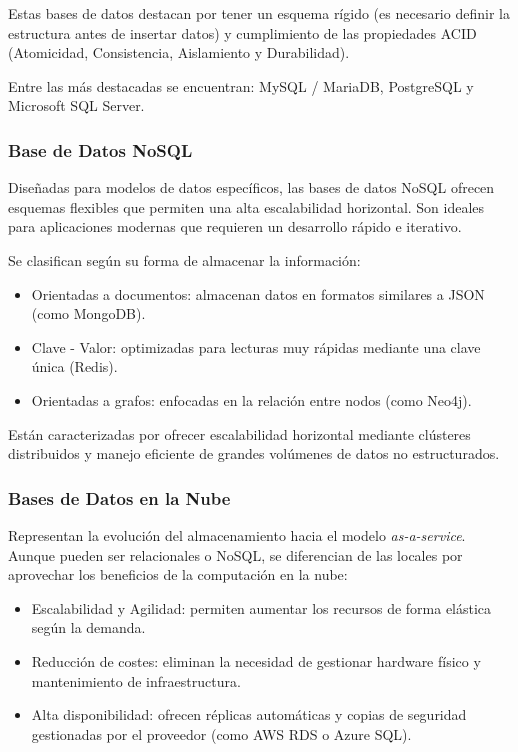 Estas bases de datos destacan por tener un esquema rígido (es necesario definir la estructura antes de insertar datos) 
y cumplimiento de las propiedades ACID (Atomicidad, Consistencia, Aislamiento y Durabilidad).

Entre las más destacadas se encuentran: MySQL / MariaDB, PostgreSQL y Microsoft SQL Server.

\subsubsection{Base de Datos NoSQL \cite{baseDatosNoSQL}}

Diseñadas para modelos de datos específicos, las bases de datos NoSQL ofrecen esquemas flexibles que permiten una alta 
escalabilidad horizontal. Son ideales para aplicaciones modernas que requieren un desarrollo rápido e iterativo.

Se clasifican según su forma de almacenar la información:

\begin{itemize}
    \item Orientadas a documentos: almacenan datos en formatos similares a JSON (como MongoDB).
    \item Clave - Valor: optimizadas para lecturas muy rápidas mediante una clave única (Redis).
    \item Orientadas a grafos: enfocadas en la relación entre nodos (como Neo4j).
\end{itemize}

Están caracterizadas por ofrecer escalabilidad horizontal mediante clústeres distribuidos y manejo 
eficiente de grandes volúmenes de datos no estructurados.

\subsubsection{Bases de Datos en la Nube \cite{baseDatosNube}}

Representan la evolución del almacenamiento hacia el modelo \textit{as-a-service}. Aunque pueden ser relacionales o NoSQL, 
se diferencian de las locales por aprovechar los beneficios de la computación en la nube:

\begin{itemize}
    \item Escalabilidad y Agilidad: permiten aumentar los recursos de forma elástica según la demanda.
    \item Reducción de costes: eliminan la necesidad de gestionar hardware físico y mantenimiento de infraestructura.
    \item Alta disponibilidad: ofrecen réplicas automáticas y copias de seguridad gestionadas por el proveedor (como AWS 
    RDS o Azure SQL).
\end{itemize}

